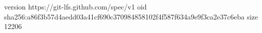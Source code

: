 version https://git-lfs.github.com/spec/v1
oid sha256:a86f3b57d4aedd03a41cf690c370984858102f4f587f634a9e9f3ca2e37c6eba
size 12206
